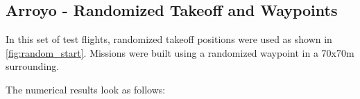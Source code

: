 
\clearpage%

\subsection{Arroyo - Randomized Takeoff and Waypoints}\label{subsec:compl_rand}

    In this set of test flights, randomized takeoff positions were used as shown in \cref{fig:random_start}. Missions were built using a randomized waypoint in a 70x70m surrounding.

    The numerical results look as follows:

